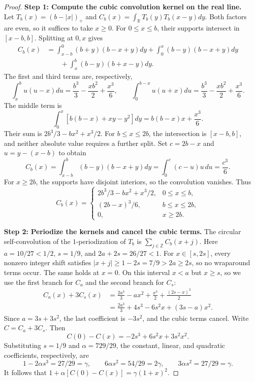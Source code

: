 \documentclass[a4paper,11pt]{article}
\theoremstyle{remark}
\begin{document}
\begin{proof}
\textbf{Step 1: Compute the cubic convolution kernel on the real line.}
Let $T_b(x)=(b-|x|)_+$ and $C_b(x)=\int_{\mathbb R}T_b(y)T_b(x-y)dy$.
Both factors are even, so it suffices to take $x\ge0$. For $0\le x\le b$, their supports intersect in
$[x-b,b]$. Splitting at $0,x$ gives
\begin{align*}
 C_b(x)&=\int_{x-b}^0(b+y)(b-x+y)dy
 +\int_0^x(b-y)(b-x+y)dy\\
 &\qquad+\int_x^b(b-y)(b+x-y)dy.
\end{align*}
The first and third terms are, respectively,
\[
 \int_x^b u(u-x)du=\frac{b^3}{3}-\frac{xb^2}{2}+\frac{x^3}{6},
 \qquad\int_0^{b-x}u(u+x)du
 =\frac{b^3}{3}-\frac{xb^2}{2}+\frac{x^3}{6}.
\]
The middle term is
\[
 \int_0^x[b(b-x)+xy-y^2]dy=b(b-x)x+\frac{x^3}{6}.
\]
Their sum is $2b^3/3-bx^2+x^3/2$.
For $b\le x\le2b$, the intersection is $[x-b,b]$, and neither absolute value requires a further split.
Set $c=2b-x$ and $u=y-(x-b)$ to obtain
\[
 C_b(x)=\int_{x-b}^b(b-y)(b-x+y)dy
 =\int_0^c(c-u)u\,du=\frac{c^3}{6}.
\]
For $x\ge2b$, the supports have disjoint interiors, so the convolution vanishes. Thus
\[
 C_b(x)=\begin{cases}
 2b^3/3-bx^2+x^3/2,&0\le x\le b,\\
 (2b-x)^3/6,&b\le x\le2b,\\0,&x\ge2b.
 \end{cases}
\]

\textbf{Step 2: Periodize the kernels and cancel the cubic terms.}
The circular self-convolution of the $1$-periodization of $T_b$ is
$\sum_{j\in\mathbb Z}C_b(x+j)$. Here $a=10/27<1/2$, $s=1/9$, and
$2a+2s=26/27<1$. For $x\in[s,2s]$, every nonzero integer shift satisfies
$|x+j|\ge1-2s=7/9>2a\ge2s$, so no wraparound terms occur. The same holds at $x=0$.
On this interval $x<a$ but $x\ge s$, so we use the first branch for $C_a$ and the second branch for $C_s$:
\begin{align*}
 C_a(x)+3C_s(x)
 &=\frac{2a^3}{3}-ax^2+\frac{x^3}{2}
   +\frac{(2s-x)^3}{2}\\
 &=\frac{2a^3}{3}+4s^3-6s^2x+(3s-a)x^2.
\end{align*}
Since $a=3s+3s^2$, the last coefficient is $-3s^2$, and the cubic terms cancel.
Write $C=C_a+3C_s$. Then
\[
 C(0)-C(x)=-2s^3+6s^2x+3s^2x^2.
\]
Substituting $s=1/9$ and $\alpha=729/29$, the constant, linear, and quadratic coefficients, respectively, are
\[
 1-2\alpha s^3=27/29=\gamma,\qquad
 6\alpha s^2=54/29=2\gamma,\qquad
 3\alpha s^2=27/29=\gamma.
\]
It follows that $1+\alpha[C(0)-C(x)]=\gamma(1+x)^2$.


\end{proof}
\end{document}
